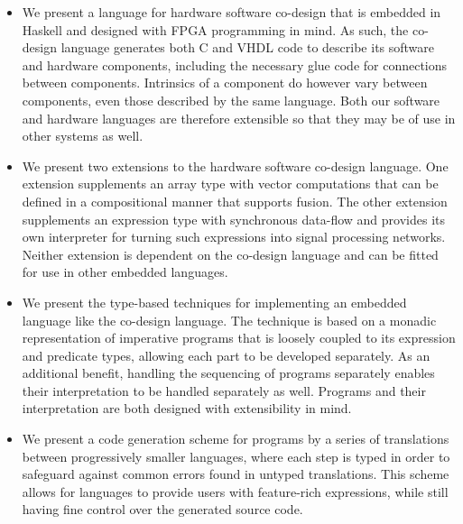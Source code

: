 \documentclass[../paper.tex]{subfiles}
\begin{document}
\begin{itemize}
\item We present a language for hardware software co-design that is embedded in Haskell and designed with FPGA programming in mind. As such, the co-design language generates both C and VHDL code to describe its software and hardware components, including the necessary glue code for connections between components. Intrinsics of a component do however vary between components, even those described by the same language. Both our software and hardware languages are therefore extensible so that they may be of use in other systems as well.

\item We present two extensions to the hardware software co-design language. One extension supplements an array type with vector computations that can be defined in a compositional manner that supports fusion. The other extension supplements an expression type with synchronous data-flow and provides its own interpreter for turning such expressions into signal processing networks. Neither extension is dependent on the co-design language and can be fitted for use in other embedded languages.

\item We present the type-based techniques for implementing an embedded language like the co-design language. The technique is based on a monadic representation of imperative programs that is loosely coupled to its expression and predicate types, allowing each part to be developed separately. As an additional benefit, handling the sequencing of programs separately enables their interpretation to be handled separately as well. Programs and their interpretation are both designed with extensibility in mind.

\item We present a code generation scheme for programs by a series of translations between progressively smaller languages, where each step is typed in order to safeguard against common errors found in untyped translations. This scheme allows for languages to provide users with feature-rich expressions, while still having fine control over the generated source code.
\end{itemize}
\end{document}
